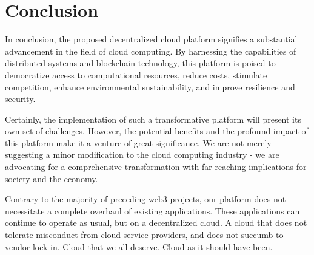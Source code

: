 \section{Conclusion}
\label{sec:conclusion}

In conclusion, the proposed decentralized cloud platform signifies a substantial advancement in the field of cloud computing. By harnessing the capabilities of distributed systems and blockchain technology, this platform is poised to democratize access to computational resources, reduce costs, stimulate competition, enhance environmental sustainability, and improve resilience and security.

Certainly, the implementation of such a transformative platform will present its own set of challenges. However, the potential benefits and the profound impact of this platform make it a venture of great significance. We are not merely suggesting a minor modification to the cloud computing industry - we are advocating for a comprehensive transformation with far-reaching implications for society and the economy.

Contrary to the majority of preceding web3 projects, our platform does not necessitate a complete overhaul of existing applications. These applications can continue to operate as usual, but on a decentralized cloud. A cloud that does not tolerate misconduct from cloud service providers, and does not succumb to vendor lock-in. Cloud that we all deserve. Cloud as it should have been.
